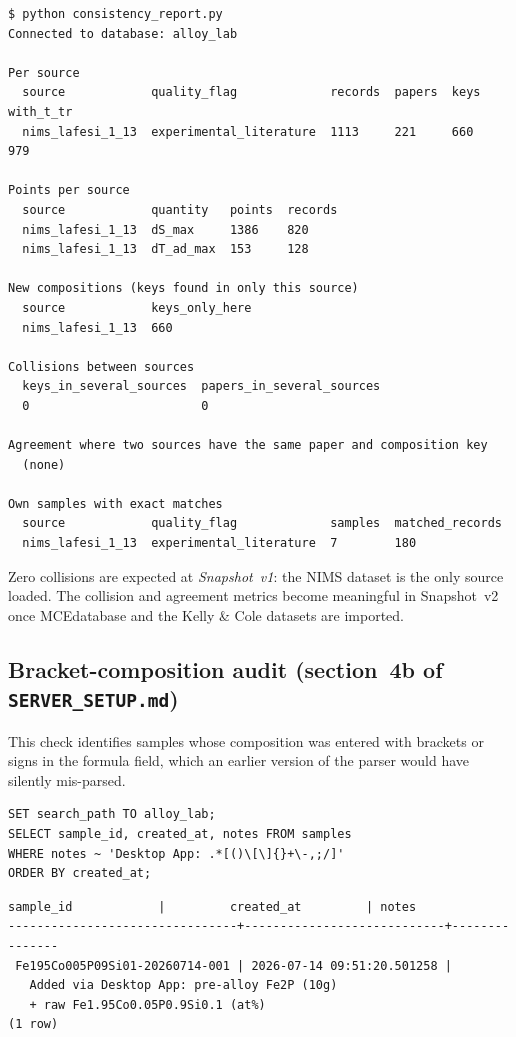 \documentclass[11pt,a4paper]{article}
\newcommand{\snap}{\textit{Snapshot~v1}}
\begin{document}
\begin{lstlisting}[style=terminal, caption={Consistency report output.}]
$ python consistency_report.py
Connected to database: alloy_lab

Per source
  source            quality_flag             records  papers  keys  with_t_tr
  nims_lafesi_1_13  experimental_literature  1113     221     660   979

Points per source
  source            quantity   points  records
  nims_lafesi_1_13  dS_max     1386    820
  nims_lafesi_1_13  dT_ad_max  153     128

New compositions (keys found in only this source)
  source            keys_only_here
  nims_lafesi_1_13  660

Collisions between sources
  keys_in_several_sources  papers_in_several_sources
  0                        0

Agreement where two sources have the same paper and composition key
  (none)

Own samples with exact matches
  source            quality_flag             samples  matched_records
  nims_lafesi_1_13  experimental_literature  7        180
\end{lstlisting}

Zero collisions are expected at \snap{}: the NIMS dataset is the only
source loaded.  The collision and agreement metrics become meaningful in
Snapshot~v2 once MCEdatabase and the Kelly \& Cole datasets are imported.

\subsection{Bracket-composition audit (section~4b of \texttt{SERVER\_SETUP.md})}

This check identifies samples whose composition was entered with brackets
or signs in the formula field, which an earlier version of the parser
would have silently mis-parsed.

\begin{lstlisting}[style=sql, caption={SQL audit for bracket-formula entries.}]
SET search_path TO alloy_lab;
SELECT sample_id, created_at, notes FROM samples
WHERE notes ~ 'Desktop App: .*[()\[\]{}+\-,;/]'
ORDER BY created_at;
\end{lstlisting}

\begin{lstlisting}[style=terminal, caption={Bracket audit result.}]
           sample_id            |         created_at         | notes
--------------------------------+----------------------------+---------------
 Fe195Co005P09Si01-20260714-001 | 2026-07-14 09:51:20.501258 |
   Added via Desktop App: pre-alloy Fe2P (10g)
   + raw Fe1.95Co0.05P0.9Si0.1 (at%)
(1 row)
\end{lstlisting}
\end{document}

